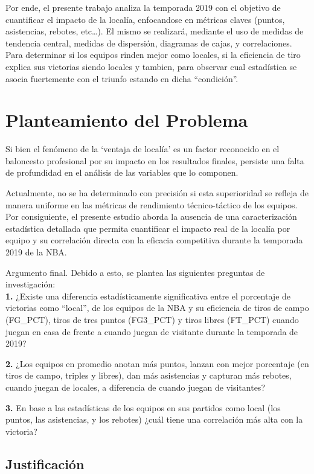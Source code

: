 \documentclass[oneside,11pt]{Latex/Classes/PhDthesisPSnPDF}
\begin{document}
Por ende, el presente trabajo analiza la temporada 2019 con el objetivo
de cuantificar el impacto de la localía, enfocandose en métricas claves
(puntos, asistencias, rebotes, etc\ldots). El mismo se realizará,
mediante el uso de medidas de tendencia central, medidas de dispersión,
diagramas de cajas, y correlaciones. Para determinar si los equipos
rinden mejor como locales, si la eficiencia de tiro explica sus
victorias siendo locales y tambien, para observar cual estadística se
asocia fuertemente con el triunfo estando en dicha ``condición''.

\chapter{Planteamiento del Problema}

Si bien el fenómeno de la `ventaja de localía' es un factor reconocido
en el baloncesto profesional por su impacto en los resultados finales,
persiste una falta de profundidad en el análisis de las variables que lo
componen.

Actualmente, no se ha determinado con precisión si esta superioridad se
refleja de manera uniforme en las métricas de rendimiento
técnico-táctico de los equipos. Por consiguiente, el presente estudio
aborda la ausencia de una caracterización estadística detallada que
permita cuantificar el impacto real de la localía por equipo y su
correlación directa con la eficacia competitiva durante la temporada
2019 de la NBA.

Argumento final. Debido a esto, se plantea las siguientes preguntas de
investigación:\\

\textbf{1.} ¿Existe una diferencia estadísticamente significativa entre
el porcentaje de victorias como ``local'', de los equipos de la NBA y su
eficiencia de tiros de campo (FG\_PCT), tiros de tres puntos (FG3\_PCT)
y tiros libres (FT\_PCT) cuando juegan en casa de frente a cuando juegan
de visitante durante la temporada de 2019?

\textbf{2.} ¿Los equipos en promedio anotan más puntos, lanzan con mejor
porcentaje (en tiros de campo, triples y libres), dan más asistencias y
capturan más rebotes, cuando juegan de locales, a diferencia de cuando
juegan de visitantes?

\textbf{3.} En base a las estadísticas de los equipos en sus partidos
como local (los puntos, las asistencias, y los rebotes) ¿cuál tiene una
correlación más alta con la victoria?

\section{Justificación}
\end{document}
